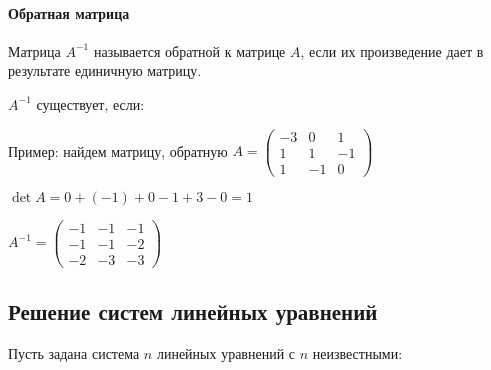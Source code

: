 \documentclass{article}
\begin{document}
\begin{flushleft}
\paragraph{Обратная матрица} Матрица $A^{-1}$ называется обратной к матрице $A$, если их произведение дает в результате единичную матрицу.

$A^{-1}$ существует, если:

\begin{multienumerate}
\end{multienumerate}

Пример: найдем матрицу, обратную $A = \begin{pmatrix}
    -3 & 0 & 1 \\
    1 & 1 & -1 \\
    1 & -1 & 0
\end{pmatrix}$

$\det A = 0 + (-1) + 0 - 1 + 3 - 0 = 1$

\begin{multienumerate}
\end{multienumerate}

$A^{-1} = \begin{pmatrix}
    -1 & -1 & -1 \\
    -1 & -1 & -2 \\
    -2 & -3 & -3
\end{pmatrix}$

\subsection{Решение систем линейных уравнений}

Пусть задана система $n$ линейных уравнений с $n$ неизвестными:


\end{flushleft}
\end{document}
